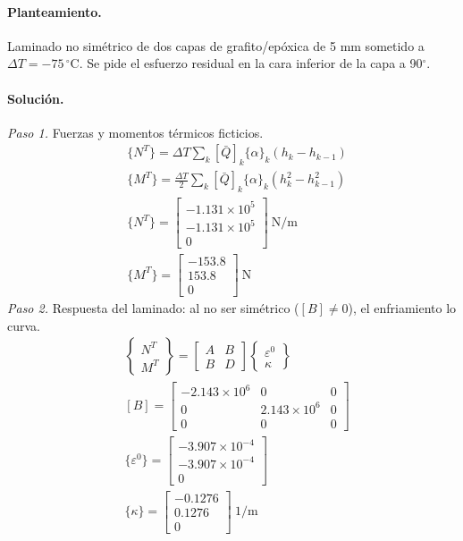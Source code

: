 \documentclass[11pt]{article}
\begin{document}
\paragraph{Planteamiento.} Laminado no simétrico de dos capas de grafito/epóxica de 5 mm sometido a $\Delta T=-75\,^\circ$C. Se pide el esfuerzo residual en la cara inferior de la capa a 90\ensuremath{^\circ}.

\paragraph{Solución.}
\textit{Paso 1.} Fuerzas y momentos térmicos ficticios.
\begin{align*}
&\{N^T\}=\Delta T\sum_k[\bar Q]_k\{\alpha\}_k(h_k-h_{k-1}) \\
&\{M^T\}=\tfrac{\Delta T}{2}\sum_k[\bar Q]_k\{\alpha\}_k(h_k^2-h_{k-1}^2) \\
&\{N^T\}=\begin{bmatrix}-1.131\times10^{5} \\ -1.131\times10^{5} \\ 0\end{bmatrix}\ \mathrm{N/m} \\
&\{M^T\}=\begin{bmatrix}-153.8 \\ 153.8 \\ 0\end{bmatrix}\ \mathrm{N}
\end{align*}
\textit{Paso 2.} Respuesta del laminado: al no ser simétrico ($[B]\neq0$), el enfriamiento lo curva.
\begin{align*}
&\begin{Bmatrix}N^T\\M^T\end{Bmatrix}=\begin{bmatrix}A&B\\B&D\end{bmatrix}\begin{Bmatrix}\varepsilon^0\\\kappa\end{Bmatrix} \\
&[B]=\begin{bmatrix}-2.143\times10^{6} & 0 & 0 \\ 0 & 2.143\times10^{6} & 0 \\ 0 & 0 & 0\end{bmatrix} \\
&\{\varepsilon^0\}=\begin{bmatrix}-3.907\times10^{-4} \\ -3.907\times10^{-4} \\ 0\end{bmatrix} \\
&\{\kappa\}=\begin{bmatrix}-0.1276 \\ 0.1276 \\ 0\end{bmatrix}\ \mathrm{1/m}
\end{align*}
\end{document}
